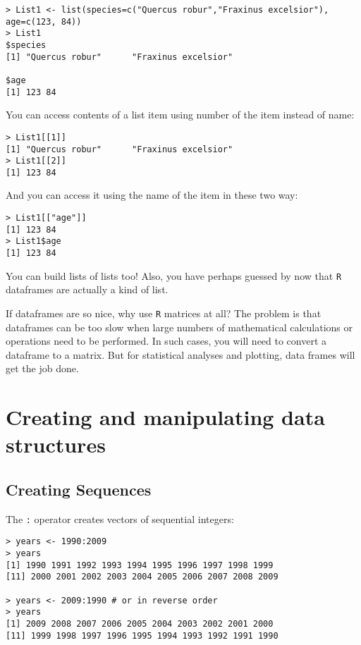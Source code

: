 \begin{lstlisting}
> List1 <- list(species=c("Quercus robur","Fraxinus excelsior"), age=c(123, 84))
> List1
$species
[1] "Quercus robur"      "Fraxinus excelsior"

$age
[1] 123 84
\end{lstlisting}

You can access contents of a list item using number of the item instead of name:
\begin{lstlisting}
> List1[[1]]  
[1] "Quercus robur"      "Fraxinus excelsior"
> List1[[2]]
[1] 123 84
\end{lstlisting}

And you can access it using the name of the item in these two way:
\begin{lstlisting}
> List1[["age"]]
[1] 123 84
> List1$age
[1] 123 84
\end{lstlisting}

You can build lists of lists too! Also, you have perhaps guessed by now 
that {\tt R} dataframes are actually a kind of list.

\begin{tipbox}
If dataframes are so nice, why use {\tt R} matrices at all? The problem 
is that dataframes can be too slow when large numbers of mathematical 
calculations or operations need to be performed. In such cases, you 
will need to convert a dataframe to a matrix. But for statistical 
analyses and plotting, data frames will get the job done.          
\end{tipbox}

\section{Creating and manipulating data structures}
 
\subsection{Creating Sequences}

The {\tt :} operator creates vectors of sequential integers:

\begin{lstlisting}
> years <- 1990:2009
> years
[1] 1990 1991 1992 1993 1994 1995 1996 1997 1998 1999
[11] 2000 2001 2002 2003 2004 2005 2006 2007 2008 2009

> years <- 2009:1990 # or in reverse order 
> years
[1] 2009 2008 2007 2006 2005 2004 2003 2002 2001 2000
[11] 1999 1998 1997 1996 1995 1994 1993 1992 1991 1990
\end{lstlisting}

